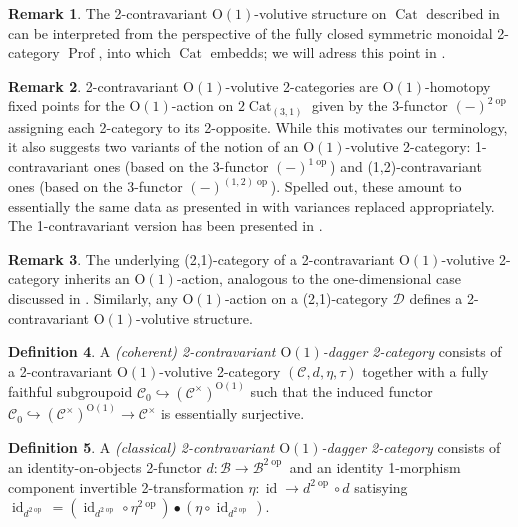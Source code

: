 \documentclass{article}
\newcommand{\Prof}{\operatorname{Prof}}%
\newcommand{\opp}{\operatorname{op}}%
\newcommand{\id}{\operatorname{id}}%
\newcommand{\Cat}{\operatorname{Cat}}%
\newcommand{\Oone}{\operatorname{O(1)}}
\newcommand{\B}{\mathcal{B}}
\newcommand{\C}{\mathcal{C}}
\newcommand{\D}{\mathcal{D}}
\numberwithin{equation}{section}
\theoremstyle{definition}
\newtheorem{definition}{Definition}[subsection]
\newtheorem{remark}[definition]{Remark}
\theoremstyle{theorem}
\begin{document}
\begin{remark}
    The 2-contravariant $\Oone$-volutive structure on $\Cat$ described in  can be interpreted from the 
    perspective of the fully closed symmetric monoidal 2-category $\Prof$, into which $\Cat$ embedds; we will adress this point in .
\end{remark}
\begin{remark}\label{Remark: variances of Oone volutive 2-categories}
    2-contravariant $\Oone$-volutive 2-categories are $\Oone$-homotopy fixed points for the $\Oone$-action on $2\Cat_{(3,1)}$ given by the 3-functor $(-)^{2\opp}$ 
    assigning each 2-category to its 2-opposite. While this motivates our terminology, it also suggests two variants of the notion of an $\Oone$-volutive 
    2-category: 1-contravariant ones (based on the 3-functor $(-)^{1\opp}$) and (1,2)-contravariant ones (based on the 3-functor $(-)^{(1,2)\opp}$). Spelled out,
    these amount to essentially the same data as presented in  with variances replaced appropriately. 
    The 1-contravariant version has been presented in \cite[Definition 2.40]{carqueville2025orbifoldshigherdaggerstructures}.
\end{remark}
\begin{remark}\label{Remark: 21categories and 2-contravariant Oone volutive structures}
    The underlying (2,1)-category of a 2-contravariant $\Oone$-volutive 2-category inherits an $\Oone$-action, analogous to the one-dimensional case discussed 
    in . Similarly, any $\Oone$-action on a (2,1)-category $\D$ defines a 2-contravariant $\Oone$-volutive 
    structure. 
\end{remark}
\begin{definition}
    A \emph{(coherent) 2-contravariant $\Oone$-dagger 2-category} consists of a 2-contravariant $\Oone$-volutive 2-category $(\C,d,\eta,\tau)$ together with 
    a fully faithful subgroupoid $\C_0 \hookrightarrow (\C^\times)^{\Oone}$ such that the induced functor 
    $\C_0 \hookrightarrow (\C^\times)^{\Oone} \to \C^\times$ is essentially surjective. 
\end{definition}
\begin{definition}\label{Definition: 2-contravariant Oone dagger 2-category}
    A \emph{(classical) 2-contravariant $\Oone$-dagger 2-category} consists of an identity-on-objects 2-functor $d \colon \B \to \B^{2\opp}$ and an
    identity 1-morphism component invertible 2-transformation $\eta \colon \id \to d^{2\opp} \circ d$ satisying $\id_{d^{2\opp}} = (\id_{d^{2\opp}}\circ \eta^{2\opp}) \bullet (\eta \circ \id_{d^{2\opp}})$.
\end{definition}
\end{document}
